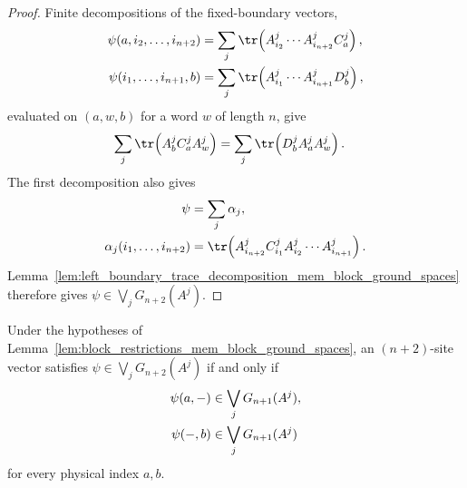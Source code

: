 \begin{proof}
    \leanok
    Finite decompositions of the fixed-boundary vectors,
    \begin{align}
        \psi(a,i_2,\ldots,i_{n+2})
         & =
        \sum_j
        \tr\!\left(A^j_{i_2}\cdots A^j_{i_{n+2}}C^j_a\right), \notag \\
        \psi(i_1,\ldots,i_{n+1},b)
         & =
        \sum_j
        \tr\!\left(A^j_{i_1}\cdots A^j_{i_{n+1}}D^j_b\right), \notag
    \end{align}
    evaluated on $(a,w,b)$ for a word $w$ of length $n$, give
    \begin{align}
        \sum_j\tr\!\left(A^j_bC^j_aA^j_w\right)
         & =
        \sum_j\tr\!\left(D^j_bA^j_aA^j_w\right). \notag
    \end{align}
    The first decomposition also gives
    \begin{align}
        \psi & =\sum_j\alpha_j, \notag \\
        \alpha_j(i_1,\ldots,i_{n+2})
             & =
        \tr\!\left(A^j_{i_{n+2}}C^j_{i_1}
        A^j_{i_2}\cdots A^j_{i_{n+1}}\right). \notag
    \end{align}
    Lemma~\ref{lem:left_boundary_trace_decomposition_mem_block_ground_spaces}
    therefore gives $\psi\in\bigvee_jG_{n+2}(A^j)$.
\end{proof}

\begin{lemma}
    \label{lem:block_restrictions_iff_block_ground_spaces}
    \leanok
    Under the hypotheses of
    Lemma~\ref{lem:block_restrictions_mem_block_ground_spaces}, an
    $(n+2)$-site vector satisfies
    $\psi\in\bigvee_jG_{n+2}(A^j)$ if and only if
    \begin{align}
        \psi(a,-) & \in\bigvee_jG_{n+1}(A^j),
        \notag                                \\
        \psi(-,b) & \in\bigvee_jG_{n+1}(A^j)
        \notag
    \end{align}
    for every physical index $a,b$.
\end{lemma}


